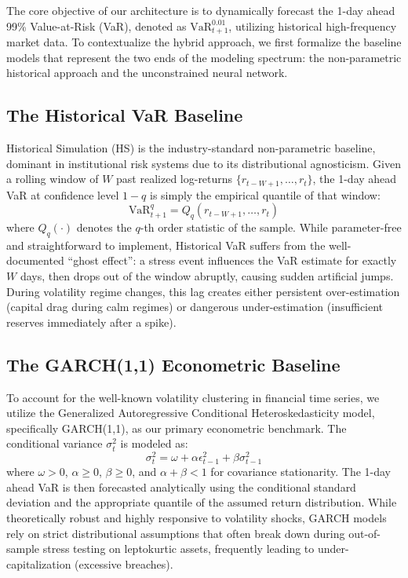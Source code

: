 
The core objective of our architecture is to dynamically forecast the 1-day ahead 99\% Value-at-Risk (VaR), denoted as $\text{VaR}_{t+1}^{0.01}$, utilizing historical high-frequency market data. To contextualize the hybrid approach, we first formalize the baseline models that represent the two ends of the modeling spectrum: the non-parametric historical approach and the unconstrained neural network.

\subsection{The Historical VaR Baseline}
Historical Simulation (HS) is the industry-standard non-parametric baseline, dominant in institutional risk systems due to its distributional agnosticism. Given a rolling window of $W$ past realized log-returns $\{r_{t-W+1}, \ldots, r_t\}$, the 1-day ahead VaR at confidence level $1 - q$ is simply the empirical quantile of that window:
\begin{equation}
    \text{VaR}_{t+1}^q = Q_q\!\left(r_{t-W+1}, \ldots, r_t\right)
\end{equation}
where $Q_q(\cdot)$ denotes the $q$-th order statistic of the sample. While parameter-free and straightforward to implement, Historical VaR suffers from the well-documented ``ghost effect'': a stress event influences the VaR estimate for exactly $W$ days, then drops out of the window abruptly, causing sudden artificial jumps. During volatility regime changes, this lag creates either persistent over-estimation (capital drag during calm regimes) or dangerous under-estimation (insufficient reserves immediately after a spike).

\subsection{The GARCH(1,1) Econometric Baseline}
To account for the well-known volatility clustering in financial time series, we utilize the Generalized Autoregressive Conditional Heteroskedasticity model, specifically GARCH(1,1), as our primary econometric benchmark. The conditional variance $\sigma_t^2$ is modeled as:
\begin{equation}
    \sigma_t^2 = \omega + \alpha \epsilon_{t-1}^2 + \beta \sigma_{t-1}^2
\end{equation}
where $\omega > 0$, $\alpha \geq 0$, $\beta \geq 0$, and $\alpha + \beta < 1$ for covariance stationarity. The 1-day ahead VaR is then forecasted analytically using the conditional standard deviation and the appropriate quantile of the assumed return distribution. While theoretically robust and highly responsive to volatility shocks, GARCH models rely on strict distributional assumptions that often break down during out-of-sample stress testing on leptokurtic assets, frequently leading to under-capitalization (excessive breaches).

